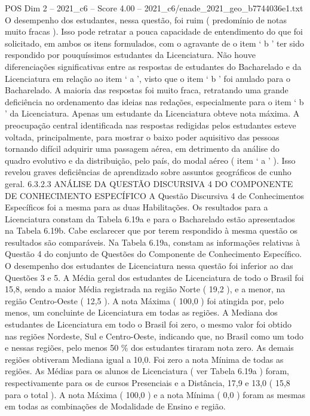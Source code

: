 \begin{textsample}{POS Dim 2 – 2021\_c6 – Score 4.00 – 2021\_c6/enade\_2021\_geo\_b7744036e1.txt}
O desempenho dos estudantes, nessa questão, foi ruim ( predomínio de notas muito fracas ).
Isso pode retratar a pouca capacidade de entendimento do que foi solicitado, em ambos os itens formulados, com o agravante de o item ‘ b ’ ter sido respondido por pouquíssimos estudantes da Licenciatura.
Não houve diferenciações significativas entre as respostas de estudantes do Bacharelado e da Licenciatura em relação ao item ‘ a ’, visto que o item ‘ b ’ foi anulado para o Bacharelado.
A maioria das respostas foi muito fraca, retratando uma grande deficiência no ordenamento das ideias nas redações, especialmente para o item ‘ b ’ da Licenciatura.
Apenas um estudante da Licenciatura obteve nota máxima.
A preocupação central identificada nas respostas redigidas pelos estudantes esteve voltada, principalmente, para mostrar o baixo poder aquisitivo das pessoas tornando difícil adquirir uma passagem aérea, em detrimento da análise do quadro evolutivo e da distribuição, pelo país, do modal aéreo ( item ‘ a ’ ).
Isso revelou graves deficiências de aprendizado sobre assuntos geográficos de cunho geral. 6.3.2.3 ANÁLISE DA QUESTÃO DISCURSIVA 4 DO COMPONENTE DE CONHECIMENTO ESPECÍFICO A Questão Discursiva 4 de Conhecimentos Específicos foi a mesma para as duas Habilitações.
Os resultados para a Licenciatura constam da Tabela 6.19a e para o Bacharelado estão apresentados na Tabela 6.19b.
Cabe esclarecer que por terem respondido à mesma questão os resultados são comparáveis.
Na Tabela 6.19a, constam as informações relativas à Questão 4 do conjunto de Questões do Componente de Conhecimento Específico.
O desempenho dos estudantes de Licenciatura nessa questão foi inferior ao das Questões 3 e 5.
A Média geral dos estudantes de Licenciatura de todo o Brasil foi 15,8, sendo a maior Média registrada na região Norte ( 19,2 ), e a menor, na região Centro-Oeste ( 12,5 ).
A nota Máxima ( 100,0 ) foi atingida por, pelo menos, um concluinte de Licenciatura em todas as regiões.
A Mediana dos estudantes de Licenciatura em todo o Brasil foi zero, o mesmo valor foi obtido nas regiões Nordeste, Sul e Centro-Oeste, indicando que, no Brasil como um todo e nessas regiões, pelo menos 50 \% dos estudantes tiraram nota zero.
As demais regiões obtiveram Mediana igual a 10,0.
Foi zero a nota Mínima de todas as regiões.
As Médias para os alunos de Licenciatura ( ver Tabela 6.19a ) foram, respectivamente para os de cursos Presenciais e a Distância, 17,9 e 13,0 ( 15,8 para o total ).
A nota Máxima ( 100,0 ) e a nota Mínima ( 0,0 ) foram as mesmas em todas as combinações de Modalidade de Ensino e região.

\end{textsample}
